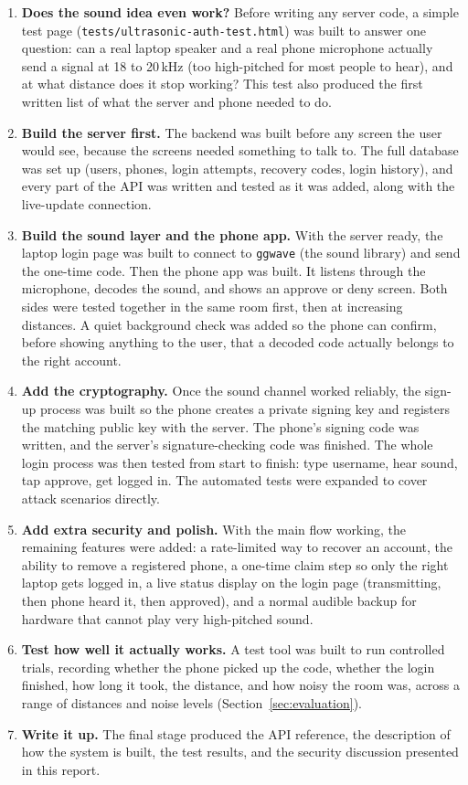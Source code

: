 \begin{enumerate}[label=\textbf{Stage \arabic*.}, leftmargin=2.2cm]
  \item \textbf{Does the sound idea even work?} Before writing any server
  code, a simple test page (\texttt{tests/\allowbreak ultrasonic-\allowbreak auth-\allowbreak test.html}) was
  built to answer one question: can a real laptop speaker and a real phone
  microphone actually send a signal at 18 to 20\,kHz (too high-pitched for
  most people to hear), and at what distance does it stop working? This
  test also produced the first written list of what the server and phone
  needed to do.
  \item \textbf{Build the server first.} The backend was built before any
  screen the user would see, because the screens needed something to talk
  to. The full database was set up (users, phones, login attempts,
  recovery codes, login history), and every part of the API was written
  and tested as it was added, along with the live-update connection.
  \item \textbf{Build the sound layer and the phone app.} With the server
  ready, the laptop login page was built to connect to \texttt{ggwave} (the
  sound library) and send the one-time code. Then the phone app was built.
  It listens through the microphone, decodes the sound, and shows an
  approve or deny screen. Both sides were tested together in the same room
  first, then at increasing distances. A quiet background check was added
  so the phone can confirm, before showing anything to the user, that a
  decoded code actually belongs to the right account.
  \item \textbf{Add the cryptography.} Once the sound channel worked
  reliably, the sign-up process was built so the phone creates a private
  signing key and registers the matching public key with the server. The
  phone's signing code was written, and the server's signature-checking
  code was finished. The whole login process was then tested from start to
  finish: type username, hear sound, tap approve, get logged in. The
  automated tests were expanded to cover attack scenarios directly.
  \item \textbf{Add extra security and polish.} With the main flow
  working, the remaining features were added: a rate-limited way to
  recover an account, the ability to remove a registered phone, a one-time
  claim step so only the right laptop gets logged in, a live status
  display on the login page (transmitting, then phone heard it, then
  approved), and a normal audible backup for hardware that cannot play
  very high-pitched sound.
  \item \textbf{Test how well it actually works.} A test tool was built to
  run controlled trials, recording whether the phone picked up the code,
  whether the login finished, how long it took, the distance, and how
  noisy the room was, across a range of distances and noise levels
  (Section~\ref{sec:evaluation}).
  \item \textbf{Write it up.} The final stage produced the API reference,
  the description of how the system is built, the test results, and the
  security discussion presented in this report.
\end{enumerate}

